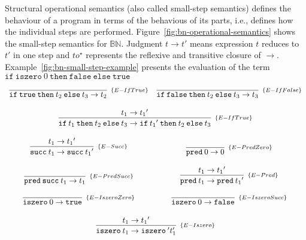 Structural operational semantics\cite{plotkin1981-operational-semantics} (also
called small-step semantics) defines the behaviour of a program in terms of the
behavious of its parts, i.e., defines how the individual steps are performed.
Figure~\ref{fig:bn-operational-semantics} shows the small-step semantics for
\(\mathbb{B}\mathbb{N}\). Judgment \(t \to t'\) means expression \(t\) reduces
to \(t'\) in one step and \(to^\star\) represents the reflexive and transitive
closure of \(\to\). Example~\ref{fig:bn-small-step-example} presents the
evaluation of the term \(\texttt{if}\:\texttt{iszero}\:0\:\texttt{then}\:
\texttt{false}\:\texttt{else}\:\texttt{true}\)

\begin{figure*}[!h]
    \[
        \begin{array}{cc}
            \infer[_{\{E-IfTrue\}}]{\texttt{if}\:\texttt{true}\:\texttt{then}\:t_2\:\texttt{else}\:t_3 \to t_2}{}
            &
            \infer[_{\{E-IfFalse\}}]{\texttt{if}\:\texttt{false}\:\texttt{then}\:t_2\:\texttt{else}\:t_3 \to t_3}{}
            \\ \\
            \multicolumn{2}{c}{
                \infer[_{\{E-IfTrue\}}]{
                    \texttt{if}\:t_1\:\texttt{then}\:t_2\:\texttt{else}\:t_3
                    \to
                    \texttt{if}\:{t_1}'\:\texttt{then}\:t_2\:\texttt{else}\:t_3
                }{
                    t_1 \to {t_1}'
                }
            }
            \\ \\
            \infer[_{\{E-Succ\}}]{\texttt{succ}\:t_1 \to \texttt{succ}\:{t_1}'}{t_1 \to {t_1}'}
            &
            \infer[_{\{E-PredZero\}}]{\texttt{pred}\:0 \to 0}{}
            \\ \\
            \infer[_{\{E-PredSucc\}}]{\texttt{pred}\:\texttt{succ}\:t_1 \to t_1}{}
            &
            \infer[_{\{E-Pred\}}]{\texttt{pred}\:t_1 \to \texttt{pred}\:{t_1}'}{t_1 \to {t_1}'}
            \\ \\
            \infer[_{\{E-IszeroZero\}}]{\texttt{iszero}\:0 \to \texttt{true}}{}
            &
            \infer[_{\{E-IszeroSucc\}}]{\texttt{iszero}\:0 \to \texttt{false}}{}
            \\ \\
            \multicolumn{2}{c}{
                \infer[_{\{E-Iszero\}}]{\texttt{iszero}\:t_1 \to \texttt{iszero}\:{'t_1'}}{{t_1 \to {t_1}'}}
            }
        \end{array}
    \]
    \centering
    \caption{Structural operational semantics for \(\mathbb{B}\mathbb{N}\)}
    \label{fig:bn-operational-semantics}
\end{figure*}


